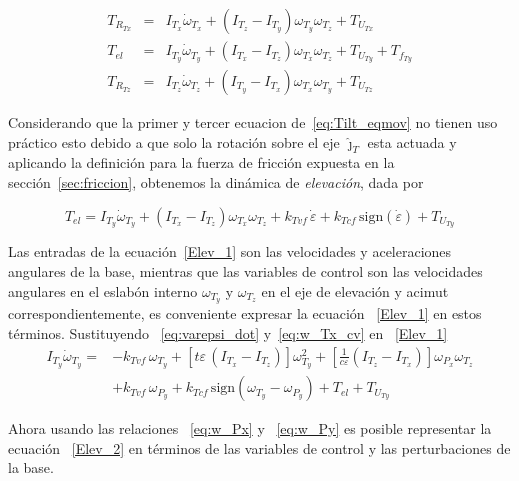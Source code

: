 \begin{equation}
\begin{array}{ccl}
T_{R_{Tx}}&=&I_{T_x}\dot{\omega}_{T_x}+\left(I_{T_z}-I_{T_y}\right)\omega _{T_y}\omega _{T_z}+T_{U_{Tx}}\\
T_{el}&=&I_{T_y}\dot{\omega}_{T_y}+\left(I_{T_x}-I_{T_z}\right)\omega _{T_x}\omega _{T_z}+T_{U_{Ty}}+T_{f_{Ty}}\\
T_{R_{Tz}}&=&I_{T_z}\dot{\omega}_{T_z}+\left(I_{T_y}-I_{T_x}\right)\omega _{T_x}\omega _{T_y}+T_{U_{Tz}}
\end{array}
\label{eq:Tilt_eqmov}
\end{equation}

Considerando que la primer y tercer ecuacion de~\ref{eq:Tilt_eqmov} no tienen uso pr\'{a}ctico esto debido a que solo la rotaci\'{o}n sobre el eje $\hat{\jmath}_{T}$ esta actuada y aplicando la definici\'{o}n para la fuerza de fricci\'{o}n expuesta en la secci\'{o}n~\ref{sec:friccion}, obtenemos la din\'{a}mica de \textit{elevaci\'{o}n}, dada por

\begin{equation}
T_{el}=I_{T_y}\dot{\omega}_{T_y}+\left(I_{T_x}-I_{T_z}\right)\omega _{T_x}\omega _{T_z}+k_{Tvf} \, \dot{\varepsilon }+k_{Tcf} \, \mathrm{sign}\left( \dot{\varepsilon} \right)+T_{U_{Ty}}
\label{Elev_1}
\end{equation} 

Las entradas de la ecuaci\'{o}n~\ref{Elev_1} son las velocidades y aceleraciones angulares de la base, mientras que las variables de control son las velocidades angulares en el eslab\'{o}n interno ${\omega}_{T_y}$ y ${\omega}_{T_z}$ en el eje de elevaci\'{o}n y acimut correspondientemente, es conveniente expresar la ecuaci\'{o}n ~\ref{Elev_1} en estos t\'{e}rminos. Sustituyendo ~\ref{eq:varepsi_dot} y~\ref{eq:w_Tx_cv} en ~\ref{Elev_1}
\begin{equation}
\begin{array}{cl}
I_{T_y}\dot{\omega}_{T_y} = & -k_{Tvf} \, \omega_{T_y} + \left[ t\varepsilon \, \left(I_{T_x}-I_{T_z}\right) \right]\omega_{T_y}^2 + \left[ \frac{1}{c \varepsilon} \left(I_{T_z}-I_{T_x}\right) \right] \omega _{P_x}\omega _{T_z} \\
 & + k_{Tvf} \, \omega_{P_y} +  k_{Tcf} \, \mathrm{sign}\left( \omega_{T_y} - \omega_{P_y} \right) + T_{el} + T_{U_{Ty}}
\end{array}
\label{Elev_2}
\end{equation}

Ahora usando las relaciones ~\ref{eq:w_Px} y ~\ref{eq:w_Py} es posible representar la ecuaci\'{o}n ~\ref{Elev_2} en t\'{e}rminos de las variables de control y las perturbaciones de la base.

